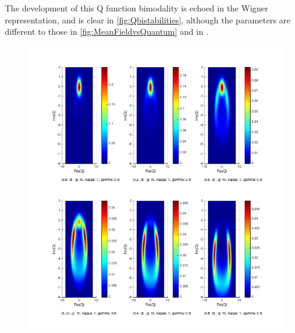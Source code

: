 The development of this Q function bimodality is echoed in the Wigner representation, and is clear in \cref{fig:Qbistabilities}, although the parameters are different to those in \cref{fig:MeanFieldvsQuantum} and in \autocite{Carmichael2015}.
\begin{figure}[h]
 \begin{minipage}{.5\linewidth}
  \centering
  \includegraphics[width=1\textwidth]{Images/Q-Bistability-OnResonance.png}
  \end{minipage}%
  \begin{minipage}{.5\linewidth}
      \centering

\end{minipage}
\end{figure}
